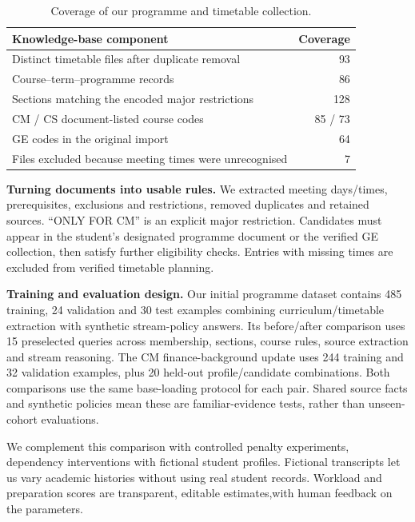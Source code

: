 \documentclass{article}
\begin{document}
\begin{table}[H]
\centering\small
\caption{Coverage of our programme and timetable collection.}
\begin{tabular}{p{3.85in}r}
\toprule
Knowledge-base component & Coverage\\
\midrule
Distinct timetable files after duplicate removal & 93\\
Course--term--programme records & 86\\
Sections matching the encoded major restrictions & 128\\
CM / CS document-listed course codes & 85 / 73\\
GE codes in the original import & 64\\
Files excluded because meeting times were unrecognised & 7\\
\bottomrule
\end{tabular}
\label{tab:data}
\end{table}

\textbf{Turning documents into usable rules.} We extracted meeting days/times, prerequisites, exclusions and restrictions, removed duplicates and retained sources. ``ONLY FOR CM'' is an explicit major restriction. Candidates must appear in the student's designated programme document or the verified GE collection, then satisfy further eligibility checks. Entries with missing times are excluded from verified timetable planning. 

\newpage
\textbf{Training and evaluation design.} Our initial programme dataset contains 485 training, 24 validation and 30 test examples combining curriculum/timetable extraction with synthetic stream-policy answers. Its before/after comparison uses 15 preselected queries across membership, sections, course rules, source extraction and stream reasoning. The CM finance-background update uses 244 training and 32 validation examples, plus 20 held-out profile/candidate combinations. Both comparisons use the same base-loading protocol for each pair. Shared source facts and synthetic policies mean these are familiar-evidence tests, rather than unseen-cohort evaluations.

We complement this comparison with controlled penalty experiments, dependency interventions with fictional student profiles. Fictional transcripts let us vary academic histories without using real student records. Workload and preparation scores are transparent, editable estimates,with human feedback on the parameters. 
\end{document}
